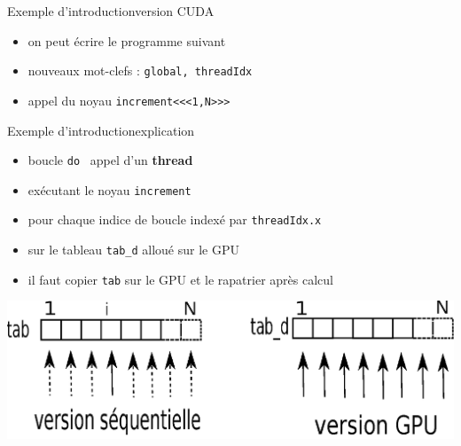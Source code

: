 \documentclass[11pt,mathserif]{beamer}
\newcommand{\gezi}{\faLongArrowRight}
\newcommand{\argi}{\faLightbulbO}
\newcommand{\kontuz}{\faExclamationTriangle}
\newcommand{\pozik}{\faSmileO}
\newcommand{\adibi}{\faCommentO}
\newif\ifC
\newcommand{\extcu}{cu}
\newcommand{\spt}{.}
\newcommand{\extcu}{cuf}
\newcommand{\spt}{\%}
\newcommand{\includeSrcCu}[1]{}
\begin{document}
\begin{frame}{Exemple d'introduction}{version CUDA}
\pause
\begin{itemize}[<+->]
  \item[\adibi] on peut écrire le programme suivant
\includeSrcCu{code/increment}
\ifC \item[\pozik] plus de boucle \fi
\item[\argi] nouveaux mot-clefs : \ifC \texttt{\_\_global\_\_, threadIdx} \else
\texttt{global, threadIdx} \fi
\item[\argi] appel du noyau \texttt{increment<<<1,N>>>}
\ifC
\item[\argi] gestion de la mémoire : \texttt{\small cudaMemcpy, cudaMalloc, cudaFree}
\fi
\end{itemize}
\end{frame}

\begin{frame}{Exemple d'introduction}{explication}
\pause
\begin{itemize}[<+->]
 \item[\argi] boucle \ifC \texttt{for} \else \texttt{do} \fi  \gezi\ appel d'un {\bf thread}
 \item[\argi] exécutant le noyau \texttt{increment}
 \item[\argi] pour chaque indice de boucle indexé par \texttt{threadIdx\spt x} 
 \item[\argi] sur le tableau \texttt{tab\_d} alloué sur le GPU
 \item[\kontuz] il faut copier \texttt{tab} sur le GPU et le rapatrier après calcul
\end{itemize}
\pause
\begin{center}
  \colorbox{white}{\includegraphics[width=0.9\linewidth]{fig/parallel.eps}}
\end{center}
\end{frame}
\end{document}
